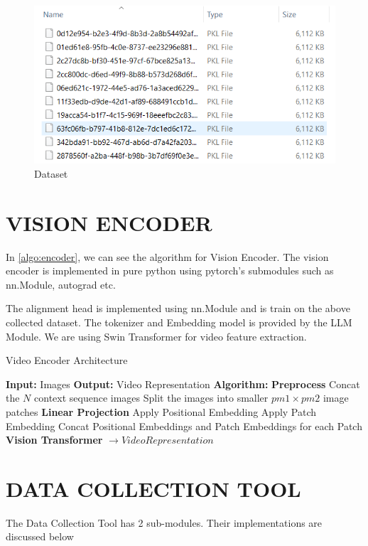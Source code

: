 \begin{spacing}{1.5}
\begin{sloppypar}
\begin{figure}
    \centering 
    \includegraphics[width=1\linewidth]{4/processed_dataset.png}
    \caption{Dataset}
    \label{fig:processed_dataset}
\end{figure}
\section{VISION ENCODER}
In \ref{algo:encoder}, we can see the algorithm for Vision Encoder. The vision encoder is implemented in pure python using pytorch's submodules such as nn.Module, autograd etc.

The alignment head is implemented using nn.Module and is train on the above collected dataset. The tokenizer and Embedding model is provided by the LLM Module. We are using Swin Transformer for video feature extraction.
\begin{algorithm}
\caption{Video Encoder Architecture}
\begin{algorithmic}
\State \textbf{Input:} Images
\State \textbf{Output:} Video Representation
\State \textbf{Algorithm:}
\State \indent \textbf{Preprocess}
\State \indent \indent Concat the $N$ context sequence images
\State \indent \indent Split the images into smaller $pm1 \times pm2$ image patches
\State \indent \textbf{Linear Projection}
\State \indent \indent Apply Positional Embedding
\State \indent \indent Apply Patch Embedding
\State \indent \indent Concat Positional Embeddings and Patch Embeddings for each Patch
\State \indent \textbf{Vision Transformer} $\to Video Representation$ 

\end{algorithmic}
\label{algo:encoder}
\end{algorithm}

\section{DATA COLLECTION TOOL}
The Data Collection Tool has 2 sub-modules. Their implementations are discussed below


\end{sloppypar}
\end{spacing}
